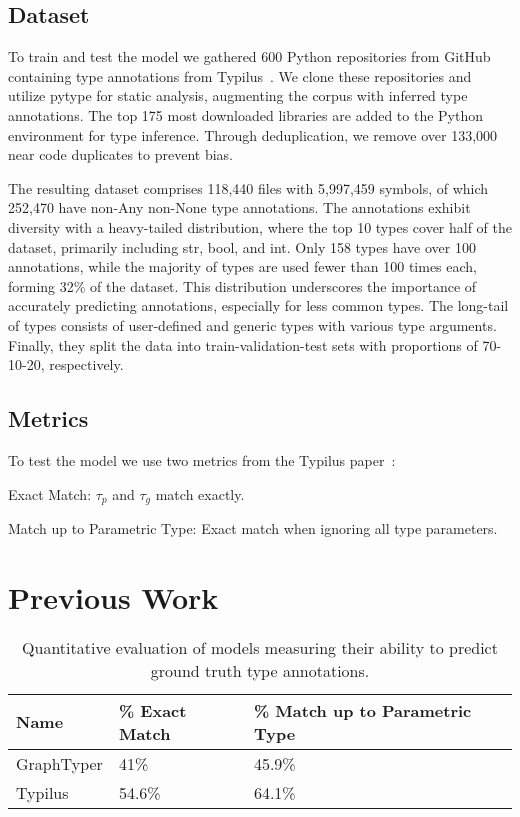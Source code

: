 \documentclass[conference]{IEEEtran}
\begin{document}
\subsection{Dataset}\label{subsec:dataset}

To train and test the model we gathered 600 Python repositories from GitHub containing type annotations from Typilus~\cite{allamanis2020typilus}.
We clone these repositories and utilize pytype for static analysis, augmenting the corpus with inferred type annotations.
The top 175 most downloaded libraries are added to the Python environment for type inference.
Through deduplication, we remove over 133,000 near code duplicates to prevent bias.

The resulting dataset comprises 118,440 files with 5,997,459 symbols, of which 252,470 have non-Any non-None type annotations.
The annotations exhibit diversity with a heavy-tailed distribution, where the top 10 types cover half of the dataset, primarily including str, bool, and int.
Only 158 types have over 100 annotations, while the majority of types are used fewer than 100 times each, forming 32\% of the dataset.
This distribution underscores the importance of accurately predicting annotations, especially for less common types.
The long-tail of types consists of user-defined and generic types with various type arguments.
Finally, they split the data into train-validation-test sets with proportions of 70-10-20, respectively.

\subsection{Metrics}\label{subsec:metrics}

To test the model we use two metrics from the Typilus paper~\cite{allamanis2020typilus}:

\begin{description}
    \item{Exact Match: $\tau_p$ and $\tau_g$ match exactly.}
    \item{Match up to Parametric Type: Exact match when ignoring all type parameters.}
\end{description}

\section{Previous Work}\label{sec:previous-work}

\begin{table*}
    \centering
    \begin{tabular}{lll}
        \toprule
        \textbf{Name} & \textbf{\% Exact Match} & \textbf{\% Match up to Parametric Type} \\
        \midrule
        GraphTyper & 41\% & 45.9\%  \\
        Typilus & 54.6\% & 64.1\% \\
        \bottomrule
    \end{tabular}
    \caption{Quantitative evaluation of models measuring their ability to
    predict ground truth type annotations.}
    \label{tab:results}
\end{table*}
\end{document}
